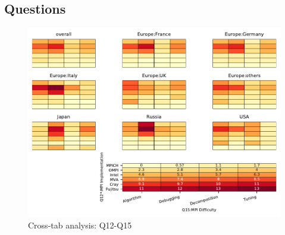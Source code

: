 
\subsection{Questions}


\begin{figure}
\begin{center}
\includegraphics[width=12cm]{../pdfs/Q12-Q15.pdf}
\caption{Cross-tab analysis: Q12-Q15}
\label{fig:Q12-Q15}
\end{center}
\end{figure}

